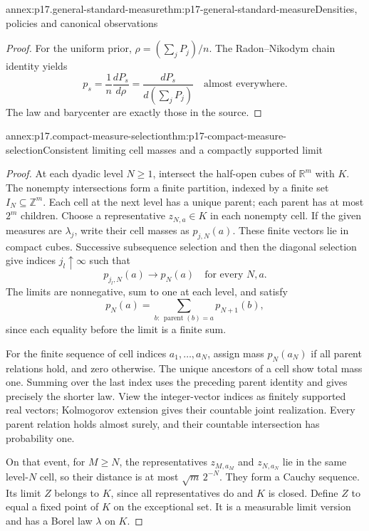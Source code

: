 \begin{annexitem}{annex:p17.general-standard-measure}{thm:p17-general-standard-measure}{Densities, policies and canonical observations}
\begin{proof}
For the uniform prior, \(\rho=(\sum_jP_j)/n\).
The Radon--Nikodym chain identity yields
\[
        p_s=\frac1n\frac{dP_s}{d\rho}
                         =\frac{dP_s}{d(\sum_jP_j)}
                                  \quad\text{almost everywhere}.
\]
The law and barycenter are exactly those in the source.
\end{proof}
\end{annexitem}

\begin{annexitem}{annex:p17.compact-measure-selection}{thm:p17-compact-measure-selection}{Consistent limiting cell masses and a compactly supported limit}
\begin{proof}
At each dyadic level \(N\geq1\), intersect the half-open cubes of
\(\mathbb R^m\) with \(K\). The nonempty intersections form a finite
partition, indexed by a finite set \(I_N\subseteq\mathbb Z^m\).
Each cell at the next level has a unique parent; each parent has
at most \(2^m\) children. Choose a representative \(z_{N,a}\in K\)
in each nonempty cell.
If the given measures are \(\lambda_j\), write their cell masses as
\(p_{j,N}(a)\).
These finite vectors lie in compact cubes.
Successive subsequence selection and then the diagonal selection
give indices \(j_l\uparrow\infty\) such that
\[
                      p_{j_l,N}(a)\longrightarrow p_N(a)
                                      \quad\text{for every }N,a.
\]
The limits are nonnegative, sum to one at each level, and satisfy
\[
                   p_N(a)=\sum_{b:\,\operatorname{parent}(b)=a}p_{N+1}(b),
\]
since each equality before the limit is a finite sum.

For the finite sequence of cell indices \(a_1,\ldots,a_N\),
assign mass \(p_N(a_N)\) if all parent relations hold, and zero otherwise.
The unique ancestors of a cell show total mass one.
Summing over the last index uses the preceding parent identity and
gives precisely the shorter law.
View the integer-vector indices as finitely supported real vectors;
Kolmogorov extension gives their countable joint realization.
Every parent relation holds almost surely, and their countable
intersection has probability one.

On that event, for \(M\geq N\), the representatives
\(z_{M,a_M}\) and \(z_{N,a_N}\) lie in the same level-\(N\) cell,
so their distance is at most \(\sqrt m\,2^{-N}\).
They form a Cauchy sequence. Its limit \(Z\) belongs to \(K\),
since all representatives do and \(K\) is closed.
Define \(Z\) to equal a fixed point of \(K\) on the exceptional set.
It is a measurable limit version and has a Borel law \(\lambda\) on \(K\).


\end{proof}
\end{annexitem}
